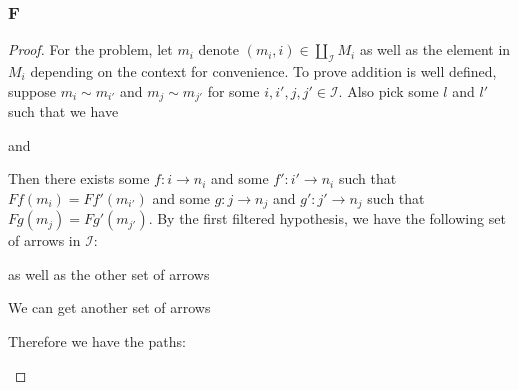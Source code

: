 \documentclass{article}
\newcommand{\fI}{\mathscr{I}}
\begin{document}
\subsubsection{F}\label{1.4.F}
\begin{proof}
    For the problem, let $m_i$ denote $(m_i,i)\in \coprod_\fI M_i$ as well as the element in $M_i$ depending on the context for convenience. To prove addition is well defined, suppose $m_i\sim m_{i'}$ and $m_j\sim m_{j'}$ for some $i,i',j,j'\in \fI$. Also pick some $l$ and $l'$ such that we have 
    \begin{center}
    \end{center}
    and
    \begin{center}
    \end{center}
    Then there exists some $f:i\to n_i$ and some $f':{i'}\to n_i$ such that $Ff(m_i)=Ff'(m_{i'})$ and some $g:j\to n_j$ and $g':j'\to n_j$ such that $Fg(m_j)=Fg'(m_{j'})$. By the first filtered hypothesis, we have the following set of arrows in $\fI$:
    \begin{center}
    \end{center}
    as well as the other set of arrows
    \begin{center}
    \end{center}
    We can get another set of arrows
    \begin{center}
    \end{center}
    Therefore we have the paths:
    \begin{center}

\end{center}
\end{proof}
\end{document}
